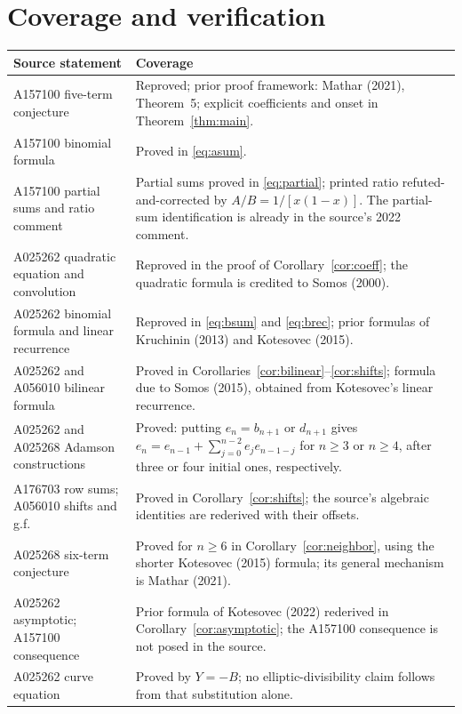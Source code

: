 \documentclass[11pt]{article}
\begin{document}
\clearpage
\section{Coverage and verification}

{\small\setlength{\tabcolsep}{4pt}
\begin{longtable}{@{}p{}p{}@{}}
\toprule
Source statement & Coverage\\
\midrule
A157100 five-term conjecture & Reproved; prior proof framework: Mathar
(2021), Theorem~5; explicit coefficients and onset in
Theorem~\ref{thm:main}.\\
A157100 binomial formula & Proved in \eqref{eq:asum}.\\
A157100 partial sums and ratio comment & Partial sums proved in
\eqref{eq:partial}; printed ratio refuted-and-corrected by
$A/B=1/[x(1-x)]$. The partial-sum identification is already
in the source's 2022 comment.\\
A025262 quadratic equation and convolution & Reproved in the proof of
Corollary~\ref{cor:coeff}; the quadratic formula is credited to Somos (2000).\\
A025262 binomial formula and linear recurrence & Reproved in
\eqref{eq:bsum} and \eqref{eq:brec}; prior formulas of Kruchinin (2013)
and Kotesovec (2015).\\
A025262 and A056010 bilinear formula & Proved in
Corollaries~\ref{cor:bilinear}--\ref{cor:shifts}; formula due to
Somos (2015), obtained from Kotesovec's linear recurrence.\\
A025262 and A025268 Adamson constructions & Proved: putting
$e_n=b_{n+1}$ or $d_{n+1}$ gives
$e_n=e_{n-1}+\sum_{j=0}^{n-2}e_j e_{n-1-j}$ for
$n\geq3$ or $n\geq4$, after three or four initial ones, respectively.\\
A176703 row sums; A056010 shifts and g.f. & Proved in
Corollary~\ref{cor:shifts}; the source's algebraic identities are
rederived with their offsets.\\
A025268 six-term conjecture & Proved for $n\geq6$ in
Corollary~\ref{cor:neighbor}, using the shorter Kotesovec (2015)
formula; its general mechanism is Mathar (2021).\\
A025262 asymptotic; A157100 consequence & Prior formula of Kotesovec
(2022) rederived in Corollary~\ref{cor:asymptotic}; the A157100
consequence is not posed in the source.\\
A025262 curve equation & Proved by $Y=-B$; no elliptic-divisibility
claim follows from that substitution alone.\\

\end{longtable}}
\end{document}
